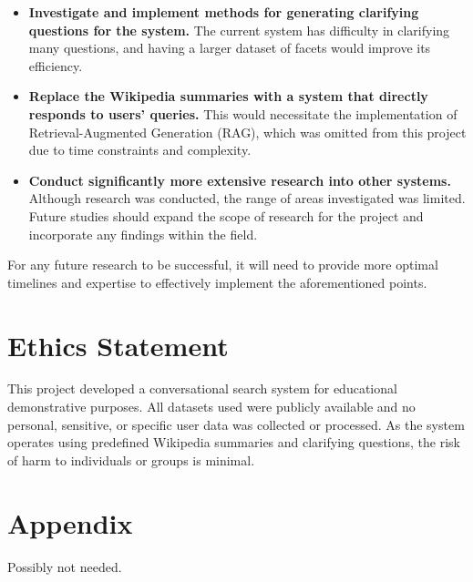 \documentclass[11pt]{article}
\begin{document}
\begin{itemize}
    \item \textbf{Investigate and implement methods for generating clarifying questions for the system.} The current system has difficulty in clarifying many questions, and having a larger dataset of facets would improve its efficiency.
    
    \item \textbf{Replace the Wikipedia summaries with a system that directly responds to users' queries.} This would necessitate the implementation of Retrieval-Augmented Generation (RAG), which was omitted from this project due to time constraints and complexity.
    
    \item \textbf{Conduct significantly more extensive research into other systems.} Although research was conducted, the range of areas investigated was limited. Future studies should expand the scope of research for the project and incorporate any findings within the field.
\end{itemize}

For any future research to be successful, it will need to provide more optimal timelines and expertise to effectively implement the aforementioned points.


\section*{Ethics Statement}
This project developed a conversational search system for educational demonstrative purposes. All datasets used were publicly available and no personal, sensitive, or specific user data was collected or processed. As the system operates using predefined Wikipedia summaries and clarifying questions, the risk of harm to individuals or groups is minimal. 




\appendix

\section{Appendix}
Possibly not needed.
\end{document}
